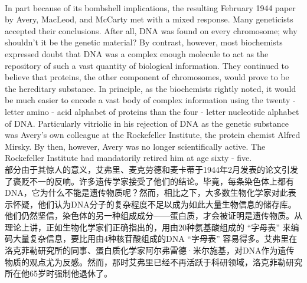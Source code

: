 \documentclass{article}
\begin{document}
\\
In part because of its bombshell implications, the resulting February 1944 paper by Avery, MacLeod, and McCarty met with a mixed response. Many geneticists accepted their conclusions. After all, DNA was found on every chromosome; why shouldn’t it be the genetic material? By contrast, however, most biochemists expressed doubt that DNA was a complex enough molecule to act as the repository of such a vast quantity of biological information. They continued to believe that proteins, the other component of chromosomes, would prove to be the hereditary substance. In principle, as the biochemists rightly noted, it would be much easier to encode a vast body of complex information using the twenty - letter amino - acid alphabet of proteins than the four - letter nucleotide alphabet of DNA. Particularly vitriolic in his rejection of DNA as the genetic substance was Avery’s own colleague at the Rockefeller Institute, the protein chemist Alfred Mirsky. By then, however, Avery was no longer scientifically active. The Rockefeller Institute had mandatorily retired him at age sixty - five.\\
部分由于其惊人的意义，艾弗里、麦克劳德和麦卡蒂于1944年2月发表的论文引发了褒贬不一的反响。许多遗传学家接受了他们的结论。毕竟，每条染色体上都有DNA，它为什么不能是遗传物质呢？然而，相比之下，大多数生物化学家对此表示怀疑，他们认为DNA分子的复杂程度不足以成为如此大量生物信息的储存库。他们仍然坚信，染色体的另一种组成成分——蛋白质，才会被证明是遗传物质。从理论上讲，正如生物化学家们正确指出的，用由20种氨基酸组成的 “字母表” 来编码大量复杂信息，要比用由4种核苷酸组成的DNA “字母表” 容易得多。艾弗里在洛克菲勒研究所的同事、蛋白质化学家阿尔弗雷德·米尔施基，对DNA作为遗传物质的观点尤为反感。然而，那时艾弗里已经不再活跃于科研领域，洛克菲勒研究所在他65岁时强制他退休了。\\
\end{document}
